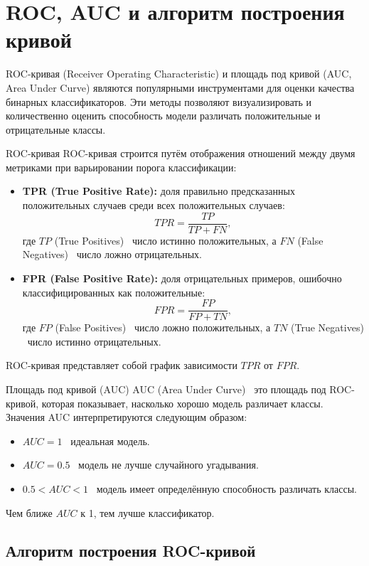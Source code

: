 \section*{ROC, AUC и алгоритм построения кривой}

ROC-кривая (Receiver Operating Characteristic) и площадь под кривой (AUC, Area Under Curve) являются популярными инструментами для оценки качества бинарных классификаторов. Эти методы позволяют визуализировать и количественно оценить способность модели различать положительные и отрицательные классы.

ROC-кривая
ROC-кривая строится путём отображения отношений между двумя метриками при варьировании порога классификации:
\begin{itemize}
    \item \textbf{TPR (True Positive Rate):} доля правильно предсказанных положительных случаев среди всех положительных случаев:
    \[
    TPR = \frac{TP}{TP + FN},
    \]
    где $TP$ (True Positives) \textendash\ число истинно положительных, а $FN$ (False Negatives) \textendash\ число ложно отрицательных.
    \item \textbf{FPR (False Positive Rate):} доля отрицательных примеров, ошибочно классифицированных как положительные:
    \[
    FPR = \frac{FP}{FP + TN},
    \]
    где $FP$ (False Positives) \textendash\ число ложно положительных, а $TN$ (True Negatives) \textendash\ число истинно отрицательных.
\end{itemize}
ROC-кривая представляет собой график зависимости $TPR$ от $FPR$.

Площадь под кривой (AUC)
AUC (Area Under Curve) \textendash\ это площадь под ROC-кривой, которая показывает, насколько хорошо модель различает классы. Значения AUC интерпретируются следующим образом:
\begin{itemize}
    \item $AUC = 1$ \textendash\ идеальная модель.
    \item $AUC = 0.5$ \textendash\ модель не лучше случайного угадывания.
    \item $0.5 < AUC < 1$ \textendash\ модель имеет определённую способность различать классы.
\end{itemize}
Чем ближе $AUC$ к 1, тем лучше классификатор.

\subsection*{Алгоритм построения ROC-кривой}

